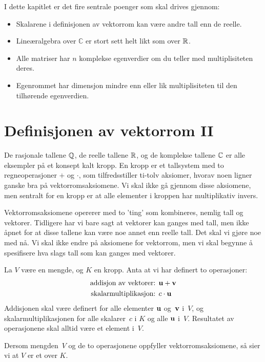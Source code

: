 

\label{ch:kompleks-linear-algebra}

I dette kapitlet er det fire sentrale poenger som skal drives gjennom:

\begin{itemize}
\item Skalarene i definisjonen av vektorrom kan være andre tall enn de reelle.

\item Lineæralgebra over $\mathbb C$ er stort sett helt likt som over $\mathbb{R}$.

\item Alle matriser har $n$ komplekse egenverdier om du teller med multiplisiteten deres.
 
\item Egenrommet har dimensjon mindre enn eller lik multiplisiteten til den tilhørende egenverdien.
\end{itemize}

\section*{Definisjonen av vektorrom II}

De rasjonale tallene $\mathbb{Q}$, de reelle tallene $\mathbb{R}$, 
og de komplekse tallene $\mathbb{C}$ er alle eksempler på et konsept kalt kropp. 
En kropp er et tallsystem med to regneoperasjoner $+$ og $\cdot$, 
som tilfredsstiller ti-tolv aksiomer, 
hvorav noen ligner ganske bra på vektorromsaksiomene. 
Vi skal ikke gå gjennom disse aksiomene, 
men sentralt for en kropp er at alle elementer i kroppen har multiplikativ invers.

Vektorromsaksiomene opererer med to 'ting' som kombineres, nemlig tall og vektorer. 
Tidligere har vi bare sagt at vektorer kan ganges med tall, 
men ikke åpnet for at disse tallene kan være noe annet enn reelle tall. 
Det skal vi gjøre noe med nå. 
Vi skal ikke endre på aksiomene for vektorrom, 
men vi skal begynne å spesifisere hva slags tall som kan ganges med vektorer. 

\begin{defn}
La $V$ være en mengde, og $K$ en kropp. Anta at vi har definert to operasjoner:
\begin{align*}
\text{addisjon av vektorer: } & \mathbf{u} + \mathbf{v} \\
\text{skalarmultiplikasjon: } & c \cdot \mathbf{u}
\end{align*}
Addisjonen skal være definert for alle elementer $\mathbf{u}$ og~$\mathbf{v}$
i~$V$, og skalarmultiplikasjonen for alle skalarer~$c$ i $K$ og alle $\mathbf{u}$
i~$V$.  Resultatet av operasjonene skal alltid være et element i~$V$.

Dersom mengden~$V$ og de to operasjonene oppfyller vektorromsaksiomene, 
så sier vi at $V$ er et  over $K$.
\end{defn}

